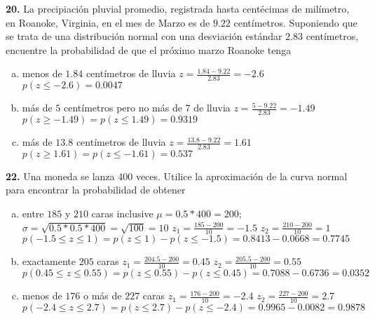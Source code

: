 \documentclass[12pt, letterpaper]{article}
\begin{document}
    \textbf{20. }La precipiación pluvial promedio, registrada hasta centécimas de milímetro, en Roanoke, Virginia, en el
    mes de Marzo es de $9.22$ centímetros. Suponiendo que se trata de una distribución normal con una desviación estándar
    $2.83$ centímetros, encuentre la probabilidad de que el próximo marzo Roanoke tenga
        \begin{enumerate}[a)]
            \item menos de $1.84$ centímetros de lluvia\vskip0.5cm
                $z=\displaystyle\frac{1.84-9.22}{2.83}=-2.6$\vskip0.5cm
                $p(z\leq -2.6)=0.0047$
            \item más de $5$ centímetros pero no más de 7 de lluvia\vskip0.5cm
                $z=\displaystyle\frac{5-9.22}{2.83}=-1.49$\vskip0.5cm
                $p(z\geq -1.49)=p(z\leq 1.49)=0.9319$
            \item más de $13.8$ centímetros de lluvia\vskip0.5cm
                $z=\displaystyle\frac{13.8-9.22}{2.83}=1.61$\vskip0.5cm
                $p(z\geq 1.61)=p(z\leq -1.61)=0.537$
        \end{enumerate}\vskip1cm

    \textbf{22. }Una moneda se lanza 400 veces. Utilice la aproximación de la curva normal para encontrar la probabilidad
    de obtener
        \begin{enumerate}[a)]
            \item entre $185$ y $210$ caras inclusive\vskip0.5cm
                $\mu=0.5*400=200$; $\sigma=\sqrt{0.5*0.5*400}=\sqrt{100}=10$\vskip0.5cm
                $z_1=\displaystyle\frac{185-200}{10}=-1.5$\vskip0.5cm
                $z_2=\displaystyle\frac{210-200}{10}=1$\vskip0.5cm
                $p(-1.5\leq z\leq 1)=p(z\leq 1)-p(z\leq -1.5)=0.8413-0.0668=0.7745$
            \item exactamente $205$ caras\vskip0.5cm
                $z_1=\displaystyle\frac{204.5-200}{10}=0.45$\vskip0.5cm
                $z_2=\displaystyle\frac{205.5-200}{10}=0.55$\vskip0.5cm
                $p(0.45\leq z\leq 0.55)=p(z\leq 0.55)-p(z\leq 0.45)=0.7088-0.6736=0.0352$
            \item menos de $176$ o más de $227$ caras\vskip0.5cm
                $z_1=\displaystyle\frac{176-200}{10}=-2.4$\vskip0.5cm
                $z_2=\displaystyle\frac{227-200}{10}=2.7$\vskip0.5cm
                $p(-2.4\leq z\leq 2.7)=p(z\leq 2.7)-p(z\leq -2.4)=0.9965-0.0082=0.9878$
        \end{enumerate}\vskip1cm
\end{document}
